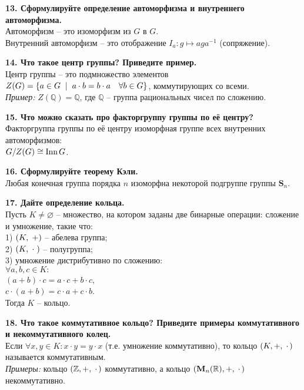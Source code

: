 \documentclass[11pt,a4paper]{article}
\newcommand{\Z}{\mathbb{Z}}
\newcommand{\Q}{\mathbb{Q}}
\newcommand{\R}{\mathbb{R}}
\newcommand{\Inn}[1]{\mathrm{Inn}\hspace{0.5mm}#1}
\renewcommand{\mid}{\hspace{2mm}\middle|\hspace{2mm}}
\begin{document}
\textbf{13. Сформулируйте определение автоморфизма и внутреннего автоморфизма.\\}
Автоморфизм -- это изоморфизм из $G$ в $G$.\\
Внутренний автоморфизм -- это отображение $I_a: g \mapsto a g a^{-1}$ (сопряжение).

\textbf{14. Что такое центр группы? Приведите пример.\\}
Центр группы -- это подмножество элементов $Z(G) = \left\{ a \in G \mid a \cdot b = b \cdot a \quad \forall b \in G \right\}$, коммутирующих со всеми.\\
\textit{Пример:} $Z(\Q) = \Q$, где $\Q$ -- группа рациональных чисел по сложению.

\textbf{15. Что можно сказать про факторгруппу группы по её центру?\\}
Факторгруппа группы по её центру изоморфная группе всех внутренних автоморфизмов:\\
$G / Z(G) \cong \Inn{G}$.

\textbf{16. Сформулируйте теорему Кэли.\\}
Любая конечная группа порядка $n$ изоморфна некоторой подгруппе группы $\mathbf{S}_n$.

\textbf{17. Дайте определение кольца.\\}
Пусть $K \neq \varnothing$ -- множество, на котором заданы две бинарные операции: сложение и умножение, такие что:\\
1) $\left( K, \hspace{1mm} + \right)$ -- абелева группа;\\
2) $\left( K, \hspace{1mm} \cdot \hspace{1mm} \right)$ -- полугруппа;\\
3) умножение дистрибутивно по сложению:\\
$\forall a, b, c \in K:$\\
$(a + b) \cdot c = a \cdot c + b \cdot c$,\\
$c \cdot (a + b) = c \cdot a + c \cdot b$.\\
Тогда $K$ -- кольцо.
\pagebreak

\textbf{18. Что такое коммутативное кольцо? Приведите примеры коммутативного и некоммутативного колец.\\}
Если $\forall x, y \in K: x \cdot y = y \cdot x$ (т.е. умножение коммутативно), то кольцо $\left( K, +, \hspace{1mm} \cdot \hspace{0.5mm} \right)$ называется коммутативным.\\
\textit{Примеры:} кольцо $\left( \Z, +, \hspace{1mm} \cdot \hspace{0.5mm} \right)$ коммутативно, а кольцо $\left( \mathbf{M}_n( \R ), +, \hspace{1mm} \cdot \hspace{0.5mm} \right)$ некоммутативно.
\end{document}
